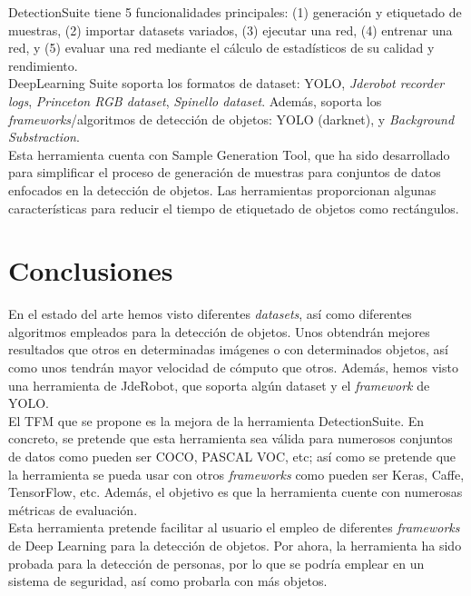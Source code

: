 \documentclass{bmvc2k}
\begin{document}
DetectionSuite tiene 5 funcionalidades principales: (1) generación y etiquetado de muestras, (2) importar datasets variados, (3) ejecutar una red, (4) entrenar una red, y (5) evaluar una red mediante el cálculo de estadísticos de su calidad y rendimiento.\\

DeepLearning Suite soporta los formatos de dataset: YOLO, \textit{Jderobot recorder logs}, \textit{Princeton RGB dataset}, \textit{Spinello dataset}. Además, soporta los \textit{frameworks}/algoritmos de detección de objetos: YOLO (darknet), y \textit{Background Substraction}.\\

Esta herramienta cuenta con Sample Generation Tool, que ha sido desarrollado para simplificar el proceso de generación de muestras para conjuntos de datos enfocados en la detección de objetos. Las herramientas proporcionan algunas características para reducir el tiempo de etiquetado de objetos como rectángulos.\\


\section{Conclusiones}

En el estado del arte hemos visto diferentes \textit{datasets}, así como diferentes algoritmos empleados para la detección de objetos. Unos obtendrán mejores resultados que otros en determinadas imágenes o con determinados objetos, así como unos tendrán mayor velocidad de cómputo que otros. Además, hemos visto una herramienta de JdeRobot, que soporta algún dataset y el \textit{framework} de YOLO.\\

El TFM que se propone es la mejora de la herramienta DetectionSuite. En concreto, se pretende que esta herramienta sea válida para numerosos conjuntos de datos como pueden ser COCO, PASCAL VOC, etc; así como se pretende que la herramienta se pueda usar con otros \textit{frameworks} como pueden ser Keras, Caffe, TensorFlow, etc. Además, el objetivo es que la herramienta cuente con numerosas métricas de evaluación.\\

Esta herramienta pretende facilitar al usuario el empleo de diferentes \textit{frameworks} de Deep Learning para la detección de objetos. Por ahora, la herramienta ha sido probada para la detección de personas, por lo que se podría emplear en un sistema de seguridad, así como probarla con más objetos.\\





\end{document}
